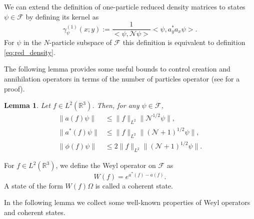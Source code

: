 \documentclass[11pt,a4paper,DIV11]{scrartcl}	%
\newtheorem{lem}[thm]{Lemma}
\newcommand{\R}{\mathds{R}}
\newcommand{\N}{\mathcal{N}}
\newcommand{\fock}{\mathcal{F}}		%
\newcommand{\Ncal}{\mathcal{N}}		%
\newcommand{\scal}[2]{\big<#1,#2\big>} %
\newcommand{\norm}[1]{\lVert#1\rVert}	%
\newcommand{\be}[1]{\begin{equation}\label{eq:#1}}	%
\newcommand{\ee}{\end{equation}}
\newcommand{\eqr}[1]{\eqref{eq:#1}}			%
\begin{document}
We can extend the definition of one-particle reduced density matrices to states $\psi \in \fock$ by defining its kernel as
\be{fock_density}
\gamma_{\psi}^{(1)}(x;y) := \frac{1}{\scal{\psi}{\Ncal \psi}} \scal{\psi}{a^\ast_y a_x \psi}.
\ee
For $\psi$ in the $N$-particle subspace of $\fock$ this definition is equivalent to definition \eqr{red_density}.

The following lemma provides some useful bounds to control creation and
annihilation operators in terms of the number of particles operator (see \cite{RS2009} for a proof).


\begin{lem} \label{l:a}
  Let $f \in L^2(\R^3)$. Then, for any $\psi \in
  \mathcal{F}$,
  \begin{equation} \label{aNorm}
    \begin{aligned}
      \norm{a(f)\psi} & \leq \norm{f}_{L^2} \norm{\Ncal^{1/2}\psi}, \\
      \norm{a^*(f)\psi} & \leq \norm{f}_{L^2} \norm{(\Ncal+1)^{1/2}\psi}, \\
      \norm{\phi(f) \psi} & \leq 2 \norm{f}_{L^2} \norm{(\N+1)^{1/2} \psi}.
    \end{aligned}
  \end{equation}
\end{lem}

For $f \in L^2(\R^3)$, we define the Weyl operator on $\mathcal{F}$ as
\[
  W(f) = e^{a^*(f) - a(f)}.
\]
A state of the form $W(f)\Omega$ is called a coherent state.


In the following lemma we collect some well-known properties of Weyl operators
and coherent states.
\end{document}
